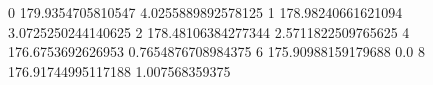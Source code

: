 0 179.9354705810547 4.0255889892578125
1 178.98240661621094 3.0725250244140625
2 178.48106384277344 2.5711822509765625
4 176.6753692626953 0.7654876708984375
6 175.90988159179688 0.0
8 176.91744995117188 1.007568359375
